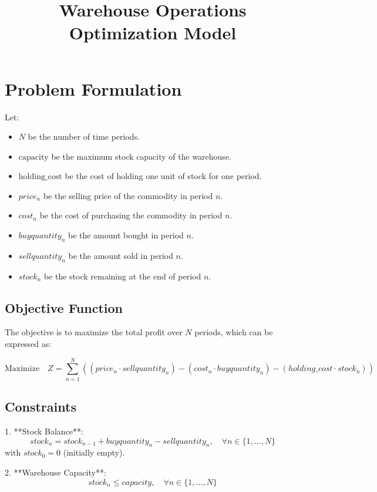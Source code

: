 \documentclass{article}
\begin{document}
\title{Warehouse Operations Optimization Model}
\author{}
\date{}
\maketitle

\section*{Problem Formulation}

Let:
\begin{itemize}
    \item \( N \) be the number of time periods.
    \item \( \text{capacity} \) be the maximum stock capacity of the warehouse.
    \item \( \text{holding\_cost} \) be the cost of holding one unit of stock for one period.
    \item \( price_n \) be the selling price of the commodity in period \( n \).
    \item \( cost_n \) be the cost of purchasing the commodity in period \( n \).
    \item \( buyquantity_n \) be the amount bought in period \( n \).
    \item \( sellquantity_n \) be the amount sold in period \( n \).
    \item \( stock_n \) be the stock remaining at the end of period \( n \).
\end{itemize}

\subsection*{Objective Function}
The objective is to maximize the total profit over \( N \) periods, which can be expressed as:

\[
\text{Maximize} \quad Z = \sum_{n=1}^{N} \left( (price_n \cdot sellquantity_n) - (cost_n \cdot buyquantity_n) - (holding\_cost \cdot stock_n) \right)
\]

\subsection*{Constraints}
1. **Stock Balance**:
   \[
   stock_n = stock_{n-1} + buyquantity_n - sellquantity_n, \quad \forall n \in \{1, \ldots, N\}
   \]
   with \( stock_0 = 0 \) (initially empty).

2. **Warehouse Capacity**:
   \[
   stock_n \leq capacity, \quad \forall n \in \{1, \ldots, N\}
   \]
   
\end{document}
